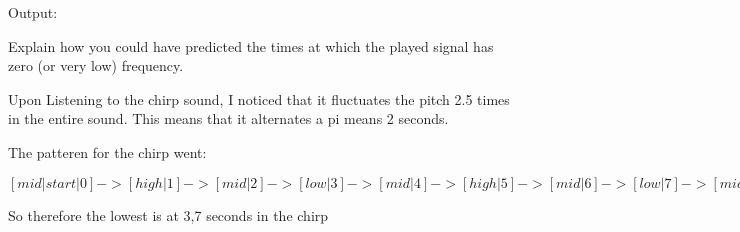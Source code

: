 {\LARGE Output:}

Explain how you could have predicted the times at which the played signal has zero (or very low) frequency.

Upon Listening to the chirp sound, I noticed that it fluctuates the pitch 2.5 times in the entire sound. This means that it alternates a pi means 2 seconds. 

The patteren for the chirp went:

$[mid | start |0] -> [high |1] -> [mid |2] -> [low |3] -> [mid |4] -> [high |5] -> [mid |6] -> [low |7] -> [mid |8] -> [high |9] -> [mid | end |10] $

So therefore the lowest is at 3,7 seconds in the chirp



\pagebreak
